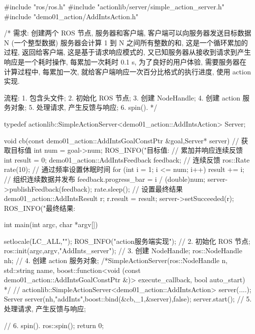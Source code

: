 \documentclass[openany, fontset=windowsold]{ctexbook}
\theoremstyle{kaiti}
\theoremstyle{normal}
\begin{document}
\begin{cpp}
  #include "ros/ros.h"
  #include "actionlib/server/simple_action_server.h"
  #include "demo01_action/AddIntsAction.h"

  /*  
      需求:
          创建两个 ROS 节点, 服务器和客户端, 
          客户端可以向服务器发送目标数据 N (一个整型数据)
          服务器会计算 1 到 N 之间所有整数的和, 这是一个循环累加的过程, 返回给客户端, 
          这是基于请求响应模式的, 
          又已知服务器从接收到请求到产生响应是一个耗时操作, 每累加一次耗时 0.1 s, 
          为了良好的用户体验, 需要服务器在计算过程中, 
          每累加一次, 就给客户端响应一次百分比格式的执行进度, 使用 action 实现.

      流程:
          1. 包含头文件;
          2. 初始化 ROS 节点;
          3. 创建 NodeHandle;
          4. 创建 action 服务对象;
          5. 处理请求, 产生反馈与响应;
          6. spin().
  */

  typedef actionlib::SimpleActionServer<demo01_action::AddIntsAction> Server;

  void cb(const demo01_action::AddIntsGoalConstPtr &goal,Server* server){
      // 获取目标值
      int num = goal->num;
      ROS_INFO("目标值:%
      // 累加并响应连续反馈
      int result = 0;
      demo01_action::AddIntsFeedback feedback; // 连续反馈
      ros::Rate rate(10); // 通过频率设置休眠时间
      for (int i = 1; i <= num; i++)
      {
          result += i;
          // 组织连续数据并发布
          feedback.progress_bar = i / (double)num;
          server->publishFeedback(feedback);
          rate.sleep();
      }
      // 设置最终结果
      demo01_action::AddIntsResult r;
      r.result = result;
      server->setSucceeded(r);
      ROS_INFO("最终结果:%
  }

  int main(int argc, char *argv[])
  {
      setlocale(LC_ALL,"");
      ROS_INFO("action服务端实现");
      // 2. 初始化 ROS 节点;
      ros::init(argc,argv,"AddInts_server");
      // 3. 创建 NodeHandle;
      ros::NodeHandle nh;
      // 4. 创建 action 服务对象;
      /*SimpleActionServer(ros::NodeHandle n, 
                          std::string name, 
                          boost::function<void (const demo01_action::AddIntsGoalConstPtr &)> execute_callback, 
                          bool auto_start)
      */
      // actionlib::SimpleActionServer<demo01_action::AddIntsAction> server(....);
      Server server(nh,"addInts",boost::bind(&cb,_1,&server),false);
      server.start();
      // 5. 处理请求, 产生反馈与响应;

      // 6. spin().   
      ros::spin();
      return 0;
  }
\end{cpp}
\end{document}
